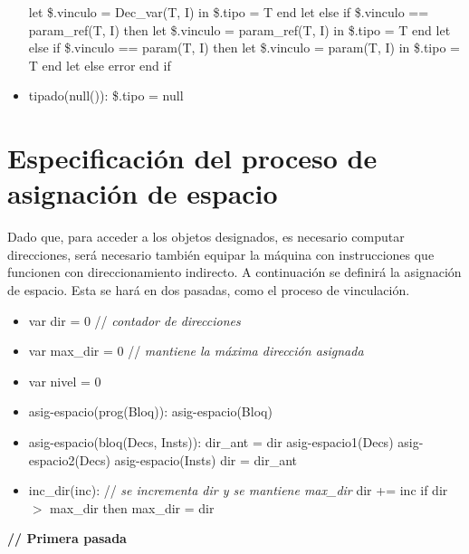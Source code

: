 \documentclass[11pt]{article}
\begin{document}
\begin{itemize}
                    \subsubitem let \$.vinculo = Dec\_var(T, I) in 
                        \subsubitem \hspace{2em} \$.tipo = T
                    \subsubitem end let
                \subitem else if \$.vinculo == param\_ref(T, I) then
                    \subsubitem let \$.vinculo = param\_ref(T, I) in 
                        \subsubitem \hspace{2em} \$.tipo = T
                    \subsubitem end let
                \subitem else if \$.vinculo == param(T, I) then
                    \subsubitem let \$.vinculo = param(T, I) in 
                        \subsubitem \hspace{2em} \$.tipo = T
                    \subsubitem end let
                \subitem else
                    \subsubitem error
                \subitem end if
            \item tipado(null()): 
                \subitem \$.tipo = null
        \end{itemize}


    \section{Especificación del proceso de asignación de espacio}

        Dado que, para acceder a los objetos designados, es necesario computar direcciones, será necesario también equipar la máquina con instrucciones que funcionen con direccionamiento indirecto. A continuación se definirá la asignación de espacio.
        Esta se hará en dos pasadas, como el proceso de vinculación. 

        \begin{itemize}
            \item var dir = 0 \/// \textit{contador de direcciones}
            \item var max\_dir = 0 \/// \textit{mantiene la máxima dirección asignada}
            \item var nivel = 0
            \item asig-espacio(prog(Bloq)): 
                \subitem asig-espacio(Bloq)
            \item asig-espacio(bloq(Decs, Insts)): 
                \subitem dir\_ant = dir
                \subitem asig-espacio1(Decs)
                \subitem asig-espacio2(Decs)
                \subitem asig-espacio(Insts)
                \subitem dir = dir\_ant
            \item inc\_dir(inc): \/// \textit{se incrementa dir y se mantiene max\_dir} 
                \subitem dir += inc
                \subitem if dir $>$ max\_dir then 
                    \subsubitem max\_dir = dir            
        \end{itemize}
        \textbf{\/// Primera pasada}
        
        
\end{document}
